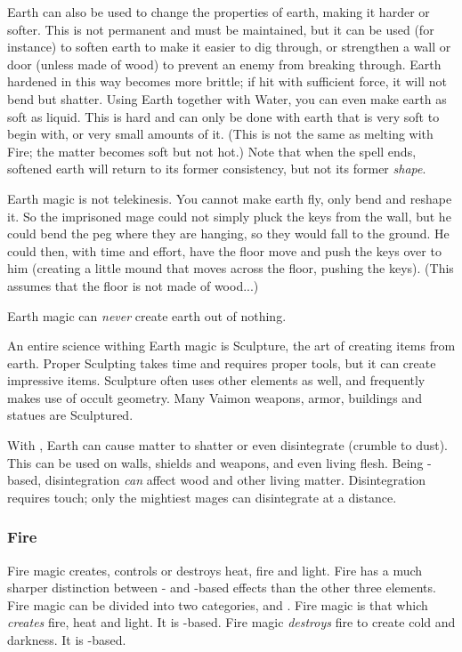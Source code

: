 Earth can also be used to change the properties of earth, making it harder or softer. This is not permanent and must be maintained, but it can be used (for instance) to soften earth to make it easier to dig through, or strengthen a wall or door (unless made of wood) to prevent an enemy from breaking through. Earth hardened in this way becomes more brittle; if hit with sufficient force, it will not bend but shatter. Using Earth together with Water, you can even make earth as soft as liquid. This is hard and can only be done with earth that is very soft to begin with, or very small amounts of it. (This is not the same as melting with Fire; the matter becomes soft but not hot.) Note that when the spell ends, softened earth will return to its former consistency, but not its former \emph{shape}.

Earth magic is not telekinesis. You cannot make earth fly, only bend and reshape it. So the imprisoned mage could not simply pluck the keys from the wall, but he could bend the peg where they are hanging, so they would fall to the ground. He could then, with time and effort, have the floor move and push the keys over to him (creating a little mound that moves across the floor, pushing the keys). (This assumes that the floor is not made of wood...) 

Earth magic can \emph{never} create earth out of nothing. 

An entire science withing Earth magic is Sculpture, the art of creating items from earth. Proper Sculpting takes time and requires proper tools, but it can create impressive items. Sculpture often uses other elements as well, and frequently makes use of occult geometry. Many Vaimon weapons, armor, buildings and statues are Sculptured. 

With \Itzach{}, Earth can cause matter to shatter or even disintegrate (crumble to dust). This can be used on walls, shields and weapons, and even living flesh. Being \Itzach{}-based, disintegration \emph{can} affect wood and other living matter. Disintegration requires touch; only the mightiest mages can disintegrate at a distance. 



\subsubsection{Fire}
Fire magic creates, controls or destroys heat, fire and light. Fire has a much sharper distinction between \Iquin{}- and \Itzach{}-based effects than the other three elements. Fire magic can be divided into two categories,  and .  Fire magic is that which \emph{creates} fire, heat and light. It is \Iquin{}-based.  Fire magic \emph{destroys} fire to create cold and darkness. It is \Itzach{}-based. 

